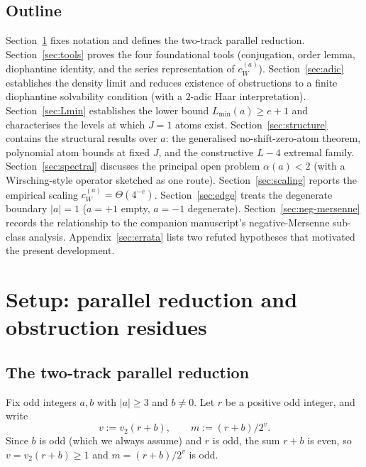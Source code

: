 \documentclass[11pt,reqno]{amsart}
\theoremstyle{plain}
\theoremstyle{definition}
\theoremstyle{remark}
\newcommand{\vtwo}{v_{2}}
\newcommand{\cWa}{c_{W}^{(a)}}
\begin{document}
\subsection{Outline}

Section~\ref{sec:setup} fixes notation and defines the two-track parallel
reduction. Section~\ref{sec:tools} proves the four foundational tools
(conjugation, order lemma, diophantine identity, and the series
representation of $\cWa$). Section~\ref{sec:adic} establishes the density
limit and reduces existence of obstructions to a finite diophantine
solvability condition (with a $2$-adic Haar interpretation).
Section~\ref{sec:Lmin} establishes the lower bound $L_{\min}(a) \ge e + 1$
and characterises the levels at which $J = 1$ atoms exist.
Section~\ref{sec:structure} contains the structural results over $a$:
the generalised no-shift-zero-atom theorem, polynomial atom bounds at
fixed $J$, and the constructive $L - 4$ extremal family.
Section~\ref{sec:spectral} discusses the principal open problem
$\alpha(a) < 2$ (with a Wirsching-style operator sketched as one route).
Section~\ref{sec:scaling} reports the empirical scaling $\cWa = \Theta(4^{-e})$.
Section~\ref{sec:edge} treats the degenerate boundary $\lvert a \rvert = 1$
($a = +1$ empty, $a = -1$ degenerate).
Section~\ref{sec:neg-mersenne} records the relationship to the companion
manuscript's negative-Mersenne sub-class analysis.
Appendix~\ref{sec:errata} lists two
refuted hypotheses that motivated the present development.

\section{Setup: parallel reduction and obstruction residues}\label{sec:setup}

\subsection{The two-track parallel reduction}

Fix odd integers $a, b$ with $\lvert a \rvert \ge 3$ and $b \ne 0$. Let
$r$ be a positive odd integer, and write
\[
v := \vtwo(r + b), \qquad m := (r + b)/2^v.
\]
Since $b$ is odd (which we always assume) and $r$ is odd, the sum
$r + b$ is even, so $v = \vtwo(r+b) \ge 1$ and $m = (r+b)/2^v$ is odd.
\end{document}
